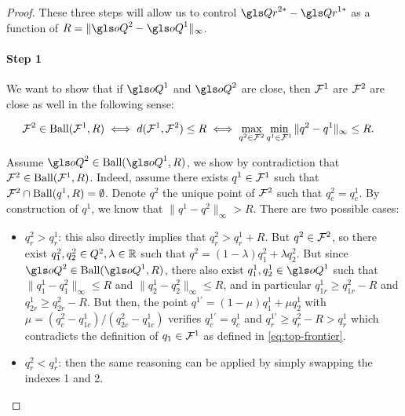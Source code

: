 \begin{proof}
    These three steps will allow us to control $\Qr^{2*} - \Qr^{1*}$ as a function of $R = \|\oQ^2-\oQ^1\|_\infty$.

    \paragraph{Step 1}

    We want to show that if $\oQ^1$ and $\oQ^2$ are close, then $\mathcal{F}^1$ are $\mathcal{F}^2$ are close as well in the following sense:

    \begin{align}
        \mathcal{F}^2\in\text{Ball}(\mathcal{F}^1, R) &\iff d(\mathcal{F}^1, \mathcal{F}^2) \leq R \iff \max_{q^2\in\mathcal{F}^2}\min_{q^1\in\mathcal{F}^1}\|q^2-q^1\|_\infty \leq R.
        \label{eq:ball-set}
    \end{align}

    Assume $\oQ^2\in\text{Ball}(\oQ^1,R)$, we show by contradiction that $\mathcal{F}^2 \in \text{Ball}(\mathcal{F}^1, R)$. Indeed, assume there exists $q^1\in \mathcal{F}^1$ such that $\mathcal{F}^2 \cap \text{Ball}(q^1, R) = \emptyset$. Denote $q^2$ the unique point of $\mathcal{F}^2$ such that $q^2_c = q^1_c$. By construction of $q^1$, we know that $\|q^1-q^2\|_\infty > R$. There are two possible cases:
    \begin{itemize}
        \item $q^2_r > q^1_r$: this also directly implies that $q^2_r > q^1_r + R$. But $q^2\in\mathcal{F}^2$, so there exist $q^2_1, q^2_2\in Q^{2},\lambda\in\mathbb{R}$ such that $q^2 = (1-\lambda)q^2_1 + \lambda q^2_2$. But since $\oQ^2\in \text{Ball}(\oQ^1, R)$, there also exist $q_1^1, q^1_2\in \oQ^1$ such that $\|q^1_1-q^2_1\|_\infty \leq R$ and $\|q^1_2-q^2_2\|_\infty \leq R$, and in particular $q^1_{1r}\geq q^2_{1r}-R$ and $q^1_{2r}\geq q^2_{2r}-R$. But then, the point $q^{1'}=(1-\mu)q^1_1 + \mu q^1_2$ with $\mu=(q^2_c-q^1_{1c})/(q^2_{2c}-q^1_{1c})$ verifies $q^{1'}_c = q^1_c$ and $q^{1'}_r \geq q^2_r - R > q^1_r$ which contradicts the definition of $q_1\in\mathcal{F}^1$ as defined in \eqref{eq:top-frontier}.
        \item $q^2_r < q^1_r$: then the same reasoning can be applied by simply swapping the indexes 1 and 2.
    \end{itemize}



\end{proof}
